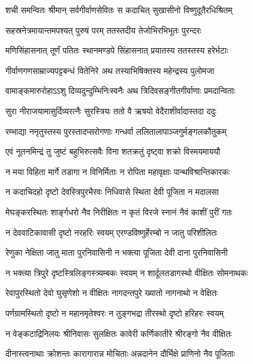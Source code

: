 \twolineshloka
{शची समन्वितः श्रीमान् सर्वगीर्वाणसेवितः}
{स कदाचित् सुखासीनो विष्णुदूतैरधिश्रितम्} %

\twolineshloka
{सहस्रनेत्रमायान्तमपश्यत् पुरुषं परम्}
{ततस्तदीय तेजोभिरभिभूतः पुरन्दरः} %

\twolineshloka
{मणिसिंहासनात् तूर्णं पतितः स्थानमण्डपे}
{सिंहासनात् प्रयातस्य ततस्तस्य हरेर्भटाः} %

\twolineshloka
{गीर्वाणगणसाम्राज्यपट्टबन्धं वितेनिरे}
{अथ तस्याभिषिक्तस्य महेन्द्रस्य पुलोमजा} %

\twolineshloka
{वामाङ्कमारुरोहाऽऽशु दिव्यदुन्दुम्भिनिःस्वनैः}
{अथ त्रिदिवसङ्गीतगीर्वाणाः प्रमदान्विताः} %

\twolineshloka
{सुरा नीराजयामासुर्दिव्यरत्नैः सुरस्त्रियः}
{ततो वै ऋषयो वेदैराशीर्वादास्तदा ददुः} %

\twolineshloka
{रम्भाद्या ननृतुस्तस्य पुरस्तादप्सरोगणाः}
{गन्धर्वा ललितालापाञ्जगुर्मङ्गलकौतुकम्} %

\twolineshloka
{एवं नूतनमिन्द्रं तु जुष्टं बहुभिरुत्सवैः}
{विना शतक्रतुं दृष्ट्वा शक्रो विस्मयमाययौ} %

\twolineshloka
{न मया विहिता मार्गे तडागा न विनिर्मिताः}
{न रोपिता महावृक्षाः पान्थविश्रान्तिकारकः} %

\twolineshloka
{न कदाचिदहो दृष्टो देवस्त्रिपुरभैरवः}
{निधिवासे स्थिता देवी पूजिता न मदालसा} %

\twolineshloka
{मेघङ्करस्थितः शार्ङ्गधरो नैव निरीक्षितः}
{न कृतं विरजे स्नानं नैवं काशीं पुरीं गतः} %

\twolineshloka
{न देववाटिकावासी दृष्टो नरहरिः स्वयम्}
{एरण्डविष्णुर्हेरम्बो न जातु परिशीलितः} %

\twolineshloka
{रेणुका नेक्षिता जातु माता पुरनिवासिनी}
{न भक्त्या पूजिता देवी दाना पुरनिवासिनी} %

\twolineshloka
{न भक्त्या त्रिपुरे दृष्टस्त्रिलिङ्गस्त्र्यम्बकः स्वयम्}
{न शार्दूलतडागस्थो वीक्षितः सोमनाथकः} %

\twolineshloka
{रेवापुरस्थितो देवो घुसृणेशो न वीक्षितः}
{नागदन्तपुरे ख्यातो नागनाथो न वेक्षितः} %

\twolineshloka
{पर्णग्रामस्थितो दृष्टो न महानमृतेश्वरः}
{न तुङ्गभद्रा तीरस्थो दृष्टो हरिहरः स्वयम्} %

\twolineshloka
{न वेङ्कटाद्रिनिलयः श्रीनिवासः सुलक्षितः}
{कावेरी कर्णिकातीरे श्रीरङ्गो नैव वीक्षितः} %

\twolineshloka
{दीनास्त्वनाथाः क्रोशन्तः कारागारान्न मोचिताः}
{अन्नदानेन दौर्भिक्षे प्राणिनो नैव पूजिताः} %

